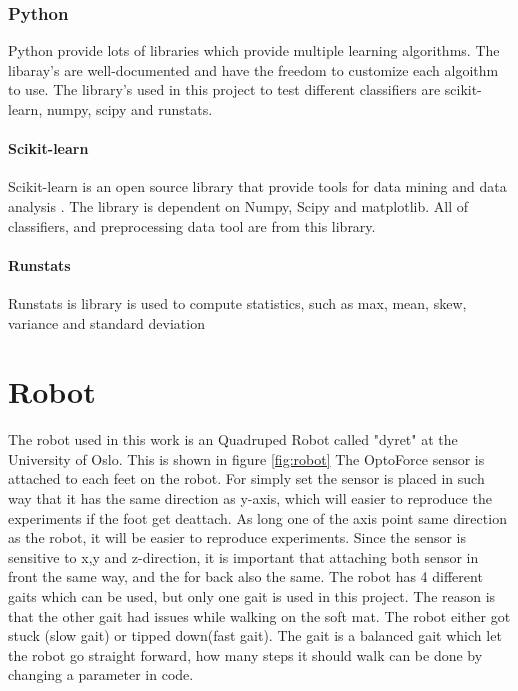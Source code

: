 \documentclass[USenglish]{ifimaster}  %
\begin{document}
\subsubsection{Python}
Python provide lots of libraries which provide multiple learning algorithms. The libaray's are well-documented and have the freedom to customize each algoithm to use. The library's used in this project to test different classifiers are scikit-learn, numpy, scipy and runstats.

\paragraph{Scikit-learn}
Scikit-learn is an open source library that provide tools for data mining and data analysis \cite{scikit-learn}. The library is dependent on Numpy, Scipy and matplotlib. All of classifiers, and preprocessing data tool are from this library. 

\paragraph{Runstats}
Runstats is library is used to compute statistics, such as max, mean, skew, variance and standard deviation \cite{runstats}


\section{Robot}
The robot used in this work is an Quadruped Robot called "dyret" at the University of Oslo. This is shown in figure \ref{fig:robot} The OptoForce sensor is attached to each feet on the robot. For simply set the sensor is placed in such way that it has the same direction as y-axis, which will easier to reproduce the experiments if the foot get deattach. As long one of the axis point same direction as the robot, it will be easier to reproduce experiments. Since the sensor is sensitive to x,y and z-direction, it is important that attaching both sensor in front the same way, and the for back also the same. The robot has 4 different gaits which can be used, but only one gait is used in this project. The reason is that the other gait had issues while walking on the soft mat. The robot either got stuck (slow gait) or tipped down(fast gait). The gait is a balanced gait which let the robot go straight forward, how many steps it should walk can be done by changing a parameter in code. 
\end{document}
